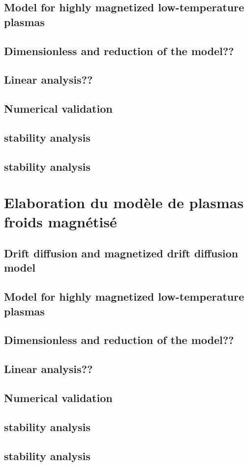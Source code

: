 		\subsection{Model for highly magnetized low-temperature plasmas}
		\subsection{Dimensionless and reduction of the model??}
		\subsection{Linear analysis??}
		\subsection{Numerical validation}
		\subsection{stability analysis}
		\subsection{stability analysis}
	\section{Elaboration du modèle de plasmas froids magnétisé}
		\subsection{Drift diffusion and magnetized drift diffusion model}
		\subsection{Model for highly magnetized low-temperature plasmas}
		\subsection{Dimensionless and reduction of the model??}
		\subsection{Linear analysis??}
		\subsection{Numerical validation}
		\subsection{stability analysis}
		\subsection{stability analysis}
